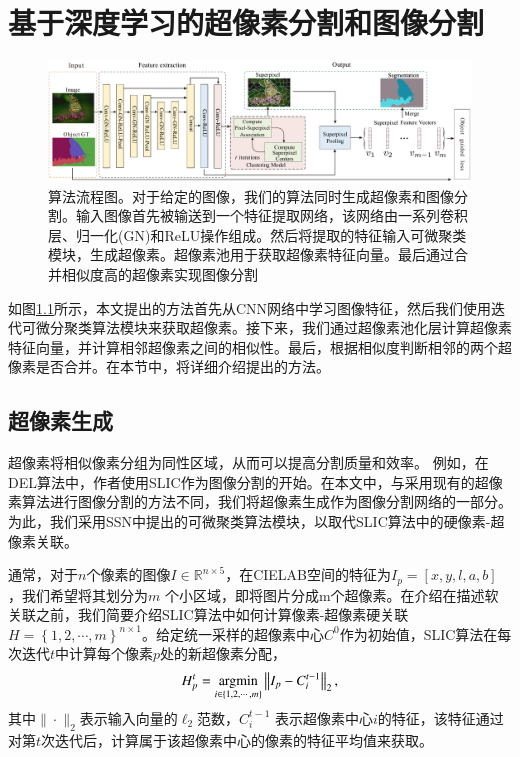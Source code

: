 
\chapter{基于深度学习的超像素分割和图像分割}

\begin{figure}[h]
\begin{center}
\includegraphics[width=1\textwidth]{figures/img/pipeline.pdf}
\end{center}
\vspace{-5mm}
\caption{算法流程图。对于给定的图像，我们的算法同时生成超像素和图像分割。输入图像首先被输送到一个特征提取网络，该网络由一系列卷积层、归一化(GN)和ReLU操作组成。然后将提取的特征输入可微聚类模块，生成超像素。超像素池用于获取超像素特征向量。最后通过合并相似度高的超像素实现图像分割}
\label{fig3.1}
\end{figure}

如图\ref{fig3.1}所示，本文提出的方法首先从CNN网络中学习图像特征，然后我们使用迭代可微分聚类算法模块来获取超像素。接下来，我们通过超像素池化层计算超像素特征向量，并计算相邻超像素之间的相似性。最后，根据相似度判断相邻的两个超像素是否合并。在本节中，将详细介绍提出的方法。

\section{超像素生成}

超像素将相似像素分组为同性区域，从而可以提高分割质量和效率。 例如，在DEL\cite{liu2018deep}算法中，作者使用SLIC作为图像分割的开始。在本文中，与采用现有的超像素算法进行图像分割的方法不同，我们将超像素生成作为图像分割网络的一部分。为此，我们采用SSN中提出的可微聚类算法模块，以取代SLIC算法中的硬像素-超像素关联。

通常，对于$n$个像素的图像\(I\in\mathbb{R}^{n\times 5}\)，在CIELAB空间的特征为$I_p=[x,y,l,a,b]$ ，我们希望将其划分为$m$ 个小区域，即将图片分成m个超像素。在介绍在描述软关联之前，我们简要介绍SLIC算法中如何计算像素-超像素硬关联$H = \left \{1, 2, \cdots, m \right \}^{n\times 1}$。给定统一采样的超像素中心$C^{0}$作为初始值，SLIC算法在每次迭代$t$中计算每个像素$p$处的新超像素分配，
\begin{equation}
H_{p}^{t} =  \mathop{{{\rm argmin}}}\limits_{{i\in\{ 1, 2, \cdots ,m \} }}\left\|I_{p}-C_{i}^{t-1}\right\|_2,
\label{eq3.1}
\end{equation}
其中$\|\cdot\|_2$表示输入向量的$\ell_2$范数，$C_i^{t-1}$ 表示超像素中心$i$的特征，该特征通过对第$t$次迭代后，计算属于该超像素中心的像素的特征平均值来获取。

